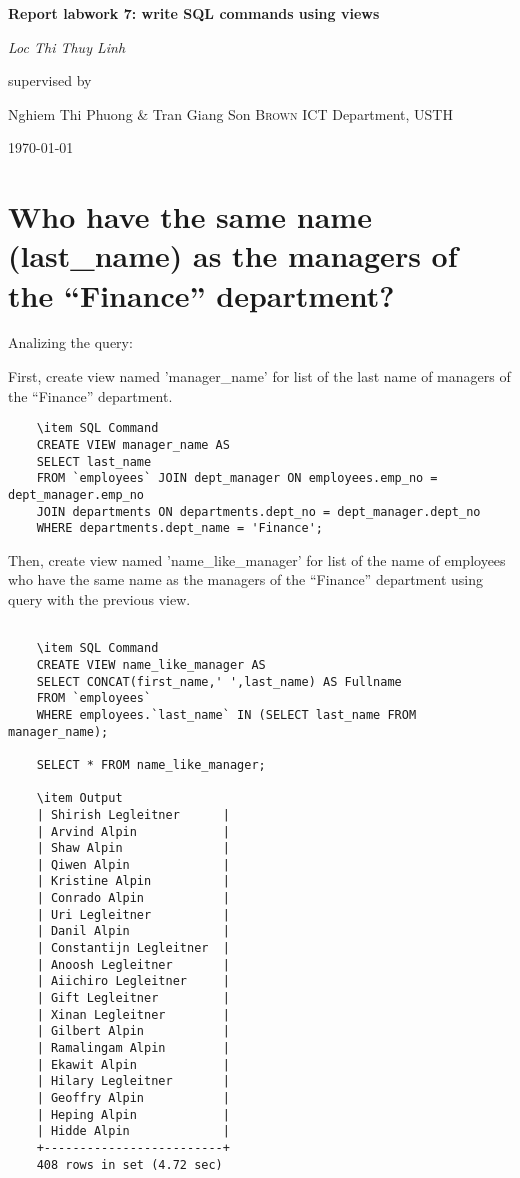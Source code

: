 \documentclass[13pt,a4paper]{report}
\begin{document}
\begin{titlepage}
	\centering
	\vspace{2cm}
	{\huge\bfseries Report labwork 7: write SQL commands using views \par}
	\vspace{2cm}
	{\Large\itshape Loc Thi Thuy Linh\par}
	\vfill
	supervised by\par
	Nghiem Thi Phuong \& Tran Giang Son \textsc{Brown}
	ICT Department, USTH\par
	\vfill
	{\large \today\par}
\end{titlepage}

\section{ Who have the same name (last_name) as the managers of the “Finance” department? }
Analizing the query:
\\
\begin{itemize}
First, create view named 'manager_name' for list of the last name of managers of the “Finance” department. 
\begin{lstlisting}
	\item SQL Command
	CREATE VIEW manager_name AS
	SELECT last_name 
	FROM `employees` JOIN dept_manager ON employees.emp_no = dept_manager.emp_no
	JOIN departments ON departments.dept_no = dept_manager.dept_no
	WHERE departments.dept_name = 'Finance';
\end{lstlisting}
Then, create view named 'name_like_manager' for list of the name of employees who have the same name as the managers of the “Finance” department using query with the previous view.
\begin{lstlisting}

	\item SQL Command
	CREATE VIEW name_like_manager AS 
	SELECT CONCAT(first_name,' ',last_name) AS Fullname 
	FROM `employees` 
	WHERE employees.`last_name` IN (SELECT last_name FROM manager_name);
	
	SELECT * FROM name_like_manager;

	\item Output
	| Shirish Legleitner      |
	| Arvind Alpin            |
	| Shaw Alpin              |
	| Qiwen Alpin             |
	| Kristine Alpin          |
	| Conrado Alpin           |
	| Uri Legleitner          |
	| Danil Alpin             |
	| Constantijn Legleitner  |
	| Anoosh Legleitner       |
	| Aiichiro Legleitner     |
	| Gift Legleitner         |
	| Xinan Legleitner        |
	| Gilbert Alpin           |
	| Ramalingam Alpin        |
	| Ekawit Alpin            |
	| Hilary Legleitner       |
	| Geoffry Alpin           |
	| Heping Alpin            |
	| Hidde Alpin             |
	+-------------------------+
	408 rows in set (4.72 sec)
\end{lstlisting}
\end{itemize}
\end{document}
